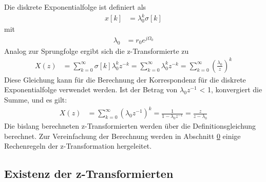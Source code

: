 Die diskrete Exponentialfolge ist definiert als
\begin{align}
x[ k] &= \lambda_{0}^{k}  \sigma[ k] \label{eq:5.22}
\end{align}
mit
\begin{align}
\lambda_{0} &= r_{0}  e^{j  \Omega_{0}} \label{eq:5.23}
\end{align}
Analog zur Sprungfolge ergibt sich die z-Transformierte zu
\begin{align}
X(z) &= \sum\limits_{k = 0}^{\infty}{\sigma[ k]  \lambda_{0}^{k}  z^{- k}} = \sum\limits_{k = 0}^{\infty}{\lambda_{0}^{k}  z^{- k}} = \sum\limits_{k = 0}^{\infty}\left( \frac{\lambda_{0}}{z} \right)^{k} \label{eq:5.24}
\end{align}
Diese Gleichung kann für die Berechnung der Korrespondenz für die diskrete Exponentialfolge verwendet werden. Ist der Betrag von \textbar \(λ_{0}\)\(z^{-1}\)\textbar{} \textless{} 1, konvergiert die Summe, und es gilt:
\begin{align}
X(z) &= \sum\limits_{k = 0}^{\infty}\left( \lambda_{0}  z^{- 1} \right)^{k} = \frac{1}{1 - \lambda_{0}  z^{- 1}} = \frac{z}{z - \lambda_{0}} \label{eq:5.25}
\end{align}
Die bislang berechneten z-Transformierten werden über die Definitionsgleichung berechnet. Zur Vereinfachung der Berechnung werden in Abschnitt \hyperref[_Ref372383177]{0} einige Rechenregeln der z-Transformation hergeleitet.

\subsection{Existenz der z-Transformierten}\label{sec:existenz-der-z-transformierten}

